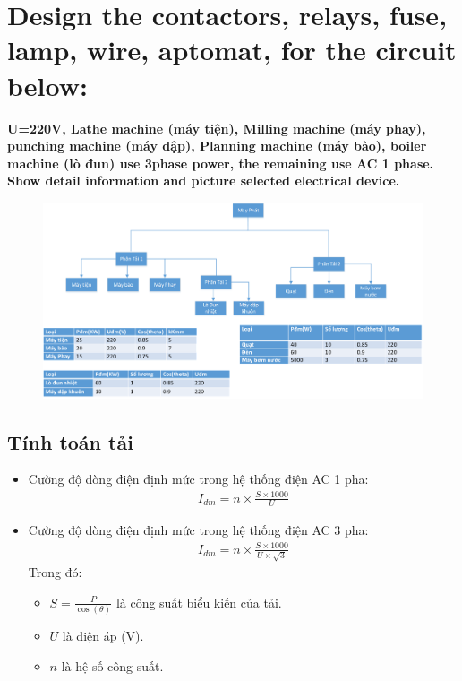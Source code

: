 \section{Design the contactors, relays, fuse, lamp, wire, aptomat, for the circuit below:}
    \textbf{U=220V, Lathe machine (máy tiện), Milling machine (máy phay), punching machine (máy dập), Planning machine (máy bào), boiler machine (lò đun) use 3phase power, the remaining use AC 1 phase. Show detail information and picture selected electrical device.}
    \begin{figure}[H]
        \centering
        \includegraphics[width=1\textwidth]{pictures/2a.png}
    \end{figure}
    \subsection{Tính toán tải}
        \begin{itemize} 
            \item Cường độ dòng điện định mức trong hệ thống điện AC 1 pha:
                \begin{align}
                    I_{dm} = n \times \frac{S \times 1000}{U}
                \end{align}
            \item Cường độ dòng điện định mức trong hệ thống điện AC 3 pha:
                \begin{align}
                    I_{dm} = n \times \frac{S \times 1000}{U \times \sqrt{3}}
                \end{align}
            Trong đó:
            \begin{itemize}
                \item $S = \frac{P}{\cos(\theta)}$ là công suất biểu kiến của tải.
                \item $U$ là điện áp (V).
                \item $n$ là hệ số công suất.
             \end{itemize}
        \end{itemize}
